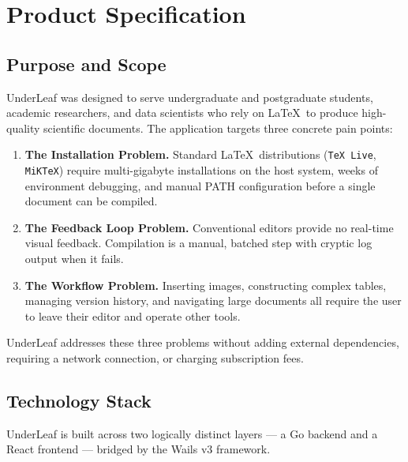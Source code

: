 \documentclass[11pt, a4paper]{article}
\begin{document}
\tableofcontents
\newpage

\section{Product Specification}

\subsection{Purpose and Scope}

UnderLeaf was designed to serve undergraduate and postgraduate students, academic researchers, and data scientists who rely on \LaTeX\ to produce high-quality scientific documents. The application targets three concrete pain points:

\begin{enumerate}
    \item \textbf{The Installation Problem.} Standard \LaTeX\ distributions (\texttt{TeX Live}, \texttt{MiKTeX}) require multi-gigabyte installations on the host system, weeks of environment debugging, and manual PATH configuration before a single document can be compiled.
    \item \textbf{The Feedback Loop Problem.} Conventional editors provide no real-time visual feedback. Compilation is a manual, batched step with cryptic log output when it fails.
    \item \textbf{The Workflow Problem.} Inserting images, constructing complex tables, managing version history, and navigating large documents all require the user to leave their editor and operate other tools.
\end{enumerate}

UnderLeaf addresses these three problems without adding external dependencies, requiring a network connection, or charging subscription fees.

\subsection{Technology Stack}

UnderLeaf is built across two logically distinct layers — a Go backend and a React frontend — bridged by the Wails v3 framework.
\end{document}
